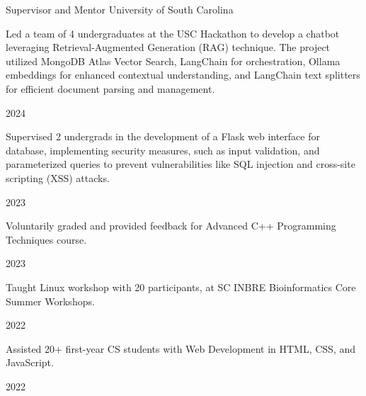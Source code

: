 

\begin{cvleadership}
    \cvled
        {Supervisor and Mentor} %
        {University of South Carolina} %
        {}
    \cvled
        {
            \begin{cvitems}
                \item {Led a team of 4 undergraduates at the USC Hackathon to develop a chatbot leveraging Retrieval-Augmented Generation (RAG) technique. The project utilized MongoDB Atlas Vector Search, LangChain for orchestration, Ollama embeddings for enhanced contextual understanding, and LangChain text splitters for efficient document parsing and management.}
            \end{cvitems}
        }
        {}
        {2024} %
    \cvled
        {
            \begin{cvitems}
                \item {Supervised 2 undergrads in the development of a Flask web interface for database, implementing security measures, such as input validation, and parameterized queries to prevent vulnerabilities like SQL injection and cross-site scripting (XSS) attacks.}
            \end{cvitems}
        }
        {}
        {2023} %
    \cvled
        {
            \begin{cvitems}
                \item {Voluntarily graded and provided feedback for Advanced C++ Programming Techniques course.}
            \end{cvitems}
        }
        {}
        {2023} %
    \cvled
        {
            \begin{cvitems}
                \item {Taught Linux workshop with 20 participants, at SC INBRE Bioinformatics Core Summer Workshops.}
            \end{cvitems}
        }
        {}
        {2022} %
    \cvled
        {
            \begin{cvitems}
                \item {Assisted 20+ first-year CS students with Web Development in HTML, CSS, and JavaScript.}
            \end{cvitems}
        }
        {}
        {2022} %
\end{cvleadership}
% 